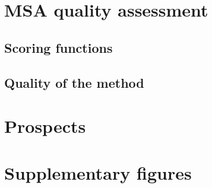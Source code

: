 \documentclass[12pt,a4paper]{article}
\begin{document}
\section{MSA quality assessment}

\subsection{Scoring functions}

\subsection{Quality of the method}

\section{Prospects}

\section*{Supplementary figures}
\end{document}
